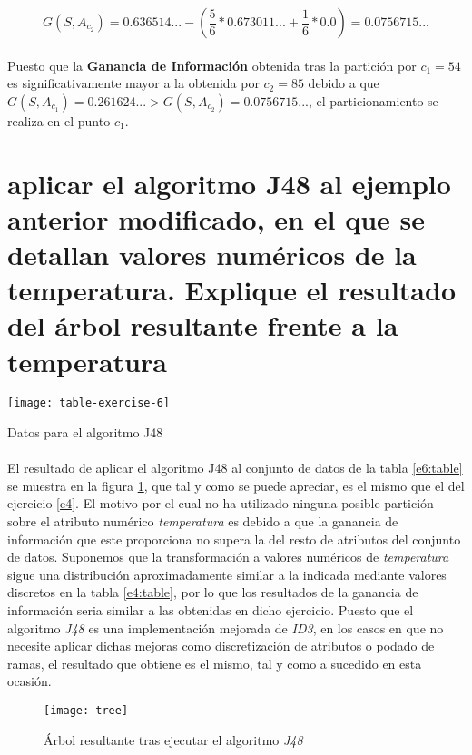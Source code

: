 \documentclass[10pt, a4paper,spanish]{article}
\begin{document}
		\begin{equation}
			\label{eq:e5-g2}
			G(S, A_{c_2}) = 0.636514... - (\frac{5}{6} * 0.673011... + \frac{1}{6} * 0.0) = 0.0756715...
		\end{equation}

		\paragraph{}
		Puesto que la \textbf{Ganancia de Información} obtenida tras la partición por $c_1 = 54$ es significativamente mayor a la obtenida por $c_2 = 85$ debido a que $G(S, A_{c_1}) = 0.261624... > G(S, A_{c_2}) = 0.0756715...$, el particionamiento se realiza en el punto \textbf{$c_1$}.

	\section{aplicar el algoritmo J48 al ejemplo anterior modificado, en el que se detallan valores numéricos de la temperatura. Explique el resultado del árbol resultante frente a la temperatura}
	\label{e6}

		\begin{table}[h]
			\begin{center}
				\texttt{[image: table-exercise-6]}
			\end{center}
			\caption{Datos para el algoritmo J48}
			\label{e6:table}
		\end{table}

		\paragraph{}
		El resultado de aplicar el algoritmo J48 al conjunto de datos de la tabla \ref{e6:table} se muestra en la figura \ref{e6:tree}, que tal y como se puede apreciar, es el mismo que el del ejercicio \ref{e4}. El motivo por el cual no ha utilizado ninguna posible partición sobre el atributo numérico \emph{temperatura} es debido a que la ganancia de información que este proporciona no supera la del resto de atributos del conjunto de datos. Suponemos que la transformación a valores numéricos de \emph{temperatura} sigue una distribución aproximadamente similar a la indicada mediante valores discretos en la tabla \ref{e4:table}, por lo que los resultados de la ganancia de información seria similar a las obtenidas en dicho ejercicio. Puesto que el algoritmo \emph{J48} es una implementación mejorada de \emph{ID3}, en los casos en que no necesite aplicar dichas mejoras como discretización de atributos o podado de ramas, el resultado que obtiene es el mismo, tal y como a sucedido en esta ocasión.

		\begin{figure}[h]
			\begin{center}
				\texttt{[image: tree]}
			\end{center}
			\caption{Árbol resultante tras ejecutar el algoritmo \emph{J48} \cite{subject:taa}}
			\label{e6:tree}
		\end{figure}

	\nocite{subject:taa}
	
  
\end{document}
